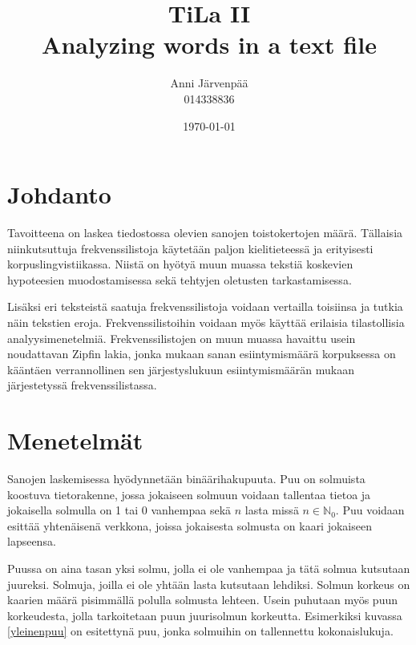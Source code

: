 \documentclass[12pt,a4paper,titlepage]{article}
\title{TiLa II \\ Analyzing words in a text file \vspace{0.5em}}
\author{\begin{tabular}{c}
Anni Järvenpää \\ 014338836
\end{tabular}}
\date{\today}
\begin{document}
\maketitle

\newpage
\null
\thispagestyle{empty}
\addtocounter{page}{-1}
\newpage

\section{Johdanto}
Tavoitteena on laskea tiedostossa olevien sanojen toistokertojen määrä. Tällaisia niinkutsuttuja frekvenssilistoja käytetään paljon kielitieteessä ja erityisesti korpuslingvistiikassa. Niistä on hyötyä muun muassa tekstiä koskevien hypoteesien muodostamisessa sekä tehtyjen oletusten tarkastamisessa. \cite{kilitiede}

Lisäksi eri teksteistä saatuja frekvenssilistoja voidaan vertailla toisiinsa ja tutkia näin tekstien eroja. Frekvenssilistoihin voidaan myös käyttää erilaisia tilastollisia analyysimenetelmiä. Frekvenssilistojen on muun muassa havaittu usein noudattavan Zipfin lakia, jonka mukaan sanan esiintymismäärä korpuksessa on kääntäen verrannollinen sen järjestyslukuun esiintymismäärän mukaan järjestetyssä frekvenssilistassa. \cite{kilitiede, wikizipf}

\section{Menetelmät}
Sanojen laskemisessa hyödynnetään binäärihakupuuta. Puu on solmuista koostuva tietorakenne, jossa jokaiseen solmuun voidaan tallentaa tietoa ja jokaisella solmulla on 1 tai 0 vanhempaa sekä $n$ lasta missä $n \in \mathbb{N}_0$. Puu voidaan esittää yhtenäisenä verkkona, joissa jokaisesta solmusta on kaari jokaiseen lapseensa. \cite{cormen}

Puussa on aina tasan yksi solmu, jolla ei ole vanhempaa ja tätä solmua kutsutaan juureksi. Solmuja, joilla ei ole yhtään lasta kutsutaan lehdiksi. Solmun korkeus on kaarien määrä pisimmällä polulla solmusta lehteen. Usein puhutaan myös puun korkeudesta, jolla tarkoitetaan puun juurisolmun korkeutta. Esimerkiksi kuvassa \ref{yleinenpuu} on esitettynä puu, jonka solmuihin on tallennettu kokonaislukuja. \cite{cormen}
\end{document}
